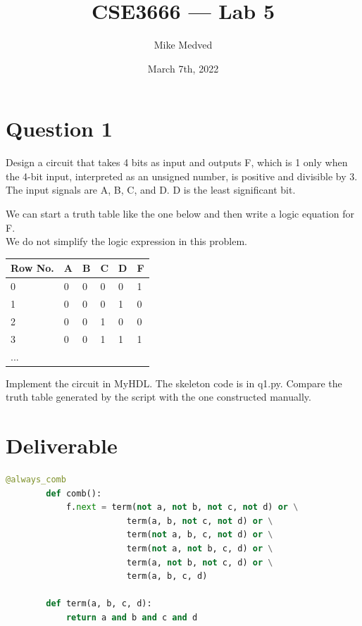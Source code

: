 \documentclass{article}
\title{CSE3666 — Lab 5}
\author{Mike Medved}
\date{March 7th, 2022}
\begin{document}
\maketitle

\section{Question 1}
Design a circuit that takes 4 bits as input and outputs F, which is 1 only when the 4-bit input, interpreted as an unsigned number, is positive and divisible by 3. The input signals are A, B, C, and D. D is the least significant bit.

\hfill \break
We can start a truth table like the one below and then write a logic equation for F.
\\
We do not simplify the logic expression in this problem.

\hfill
\begin{table}[h]
    \centering
    \begin{tabular}{|l|l|l|l|l|l|}
    \hline
    \textbf{Row No.} & \textbf{A} & \textbf{B} & \textbf{C} & \textbf{D} & \textbf{F} \\ \hline
    0 & 0 & 0 & 0 & 0 & 1 \\ \hline
    1 & 0 & 0 & 0 & 1 & 0 \\ \hline
    2 & 0 & 0 & 1 & 0 & 0 \\ \hline
    3 & 0 & 0 & 1 & 1 & 1 \\ \hline
    ... &  &  &  &  &  \\ \hline
    \end{tabular}
\end{table}

\hfill \break
Implement the circuit in MyHDL. The skeleton code is in q1.py. Compare the truth table
generated by the script with the one constructed manually.

\break
\section{Deliverable}
    \begin{lstlisting}[language=Python,frame=tb]
        @always_comb
        def comb():
            f.next = term(not a, not b, not c, not d) or \
                        term(a, b, not c, not d) or \
                        term(not a, b, c, not d) or \
                        term(not a, not b, c, d) or \
                        term(a, not b, not c, d) or \
                        term(a, b, c, d)

        def term(a, b, c, d):
            return a and b and c and d
    \end{lstlisting}
\end{document}
